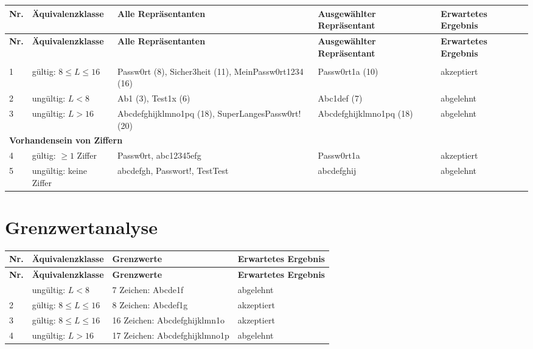 \documentclass[
	fontsize=12pt,          %
	paper=a4,               %
	numbers=noenddot,       %
	listof=totoc,           %
	listof=entryprefix,     %
	listof=nochaptergap,    %
	bibliography=totoc,     %
	parskip=half,           %
	openany                 %
]{scrbook}
\begin{document}
\begin{longtable}{| p{0.5cm} | p{3.5cm} | p{3.8cm} | p{2.5cm} | p{2.8cm} |}
	\hline
	\textbf{Nr.} & \textbf{Äquivalenzklasse} & \textbf{Alle Repräsentanten} & \textbf{Ausgewählter Repräsentant} & \textbf{Erwartetes Ergebnis} \\ \hline
	\endfirsthead
	\hline
	\textbf{Nr.} & \textbf{Äquivalenzklasse} & \textbf{Alle Repräsentanten} & \textbf{Ausgewählter Repräsentant} & \textbf{Erwartetes Ergebnis} \\ \hline
	\endhead
	\hline
	\endfoot
	\multicolumn{5}{|l|}{\textbf{Passwortlänge}} \\ \hline
	1 & gültig: $8 \leq L \leq 16$ & Passw0rt (8), Sicher3heit (11), MeinPassw0rt1234 (16) & Passw0rt1a (10) & akzeptiert \\ \hline
	2 & ungültig: $L < 8$ & Ab1 (3), Test1x (6) & Abc1def (7) & abgelehnt \\ \hline
	3 & ungültig: $L > 16$ & Abcdefghijklmno1pq (18), SuperLangesPassw0rt! (20) & Abcdefghijklmno1pq (18) & abgelehnt \\ \hline
	\multicolumn{5}{|l|}{\textbf{Vorhandensein von Ziffern}} \\ \hline
	4 & gültig: $\geq 1$ Ziffer & Passw0rt, abc12345efg & Passw0rt1a & akzeptiert \\ \hline
	5 & ungültig: keine Ziffer & abcdefgh, Passwort!, TestTest & abcdefghij & abgelehnt \\ \hline
\end{longtable}

\section*{Grenzwertanalyse}

\begin{longtable}{| p{0.5cm} | p{4.0cm} | p{4.5cm} | p{3.8cm} |}
	\hline
	\textbf{Nr.} & \textbf{Äquivalenzklasse} & \textbf{Grenzwerte} & \textbf{Erwartetes Ergebnis} \\ \hline
	\endfirsthead
	\hline
	\textbf{Nr.} & \textbf{Äquivalenzklasse} & \textbf{Grenzwerte} & \textbf{Erwartetes Ergebnis} \\ \hline
	\endhead
	\hline
	\endfoot
	1 & ungültig: $L < 8$ & 7 Zeichen: Abcde1f & abgelehnt \\ \hline
	2 & gültig: $8 \leq L \leq 16$ & 8 Zeichen: Abcdef1g & akzeptiert \\ \hline
	3 & gültig: $8 \leq L \leq 16$ & 16 Zeichen: Abcdefghijklmn1o & akzeptiert \\ \hline
	4 & ungültig: $L > 16$ & 17 Zeichen: Abcdefghijklmno1p & abgelehnt \\ \hline
\end{longtable}
\end{document}
